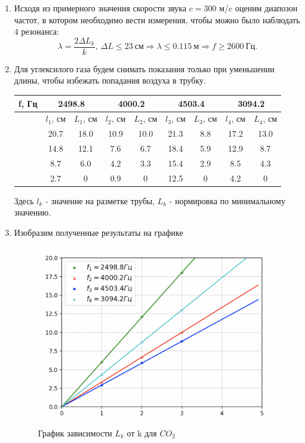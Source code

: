 \documentclass[12pt,a4paper]{article}
\begin{document}
\begin{enumerate}
    \item Исходя из примерного значения скорости звука $c=300$ м/c оценим диапозон частот, в котором необходимо вести измерения, чтобы можно было наблюдать 4 резонанса:
    \begin{equation*}
        \lambda = \frac {2 \Delta L_k}k,\ \Delta L \le 23\ см \Rightarrow \lambda \le 0.115\ м \Rightarrow f \ge 2600\ Гц.
    \end{equation*}
    \item Для углексилого газа будем снимать показания только при уменьшении длины, чтобы избежать попадания воздуха в трубку.
    \begin{center}
        \begin{tabular}{|c|c|c|c|c|c|c|c|c|}
            \hline
            f, Гц & \multicolumn{2}{|c|}{2498.8} &
            \multicolumn{2}{|c|}{4000.2} & \multicolumn{2}{|c|}{4503.4} & \multicolumn{2}{|c|}{3094.2}             
            \\
            \hline
             & $l_1$, см & $L_1$, см & $l_2$, см & $L_2$, см &$l_3$, см & $L_3$, см &$l_4$, см & $L_4$, см \\
            \hline
            &20.7 & 18.0 & 10.9 & 10.0 & 21.3 & 8.8 & 17.2 & 13.0 \\
            \hline
            &14.8 & 12.1 & 7.6 & 6.7 & 18.4 & 5.9 & 12.9 & 8.7 \\
            \hline
            &8.7 & 6.0 & 4.2 & 3.3 & 15.4 & 2.9 & 8.5 & 4.3 \\
            \hline 
            &2.7 & 0 & 0.9 & 0 & 12.5 & 0 & 4.2 & 0 \\
            \hline
        \end{tabular}
    \end{center}
    Здесь $l_k$ - значение на разметке трубы, $L_k$ - нормировка по минимальному значению.
    \item Изобразим полученные результаты на графике
\begin{figure}[htp]
    \centering
    \includegraphics[width=0.5\linewidth]{CO2.png}
    \caption{График зависимости $L_k$ от k для $CO_2$}
    \label{fig:my_label}
\end{figure}


\end{enumerate}
\end{document}
